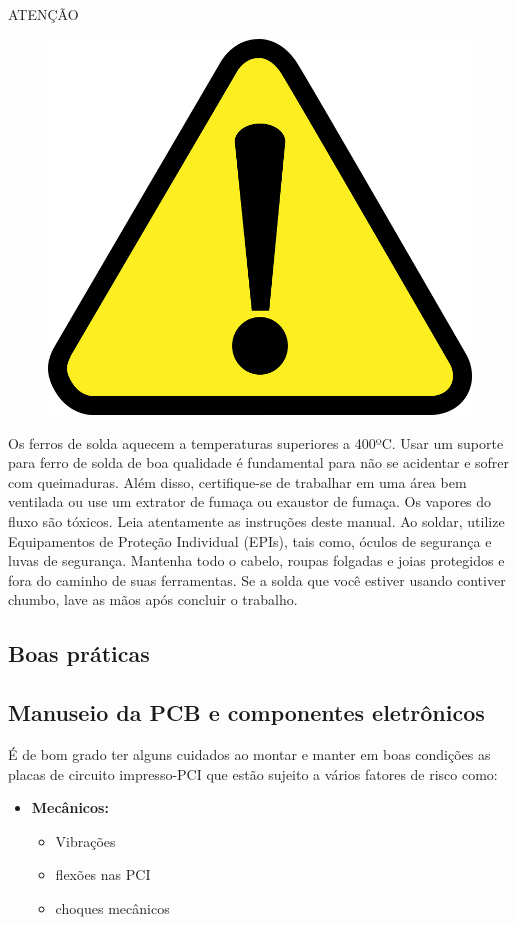 \begin{center}
ATENÇÃO
\begin{figure}[H]
 \centering
 \includegraphics[scale = 0.1]{Figuras/atenção.png}
\end{figure}
\end{center}

\par Os ferros de solda aquecem a temperaturas superiores a 400ºC. Usar um suporte para ferro de solda de boa qualidade é fundamental para não se acidentar e sofrer com queimaduras. Além disso, certifique-se de trabalhar em uma área bem ventilada ou use um extrator de fumaça ou exaustor de fumaça. Os vapores do fluxo são tóxicos. Leia atentamente as instruções deste manual. Ao soldar, utilize Equipamentos de Proteção Individual (EPIs), tais como, óculos de segurança e luvas de segurança. Mantenha todo o cabelo, roupas folgadas e joias protegidos e fora do caminho de suas ferramentas. Se a solda que você estiver usando contiver chumbo, lave as mãos após concluir o trabalho.


\subsection{Boas práticas}

\subsection{Manuseio da PCB e componentes eletrônicos}
\PAR É de bom grado ter alguns cuidados ao montar e manter em boas condições as placas de circuito impresso-PCI que estão sujeito a vários fatores de risco como:
\begin{itemize}
\item \textbf{Mecânicos:}
\begin{itemize}
\item Vibrações
\item flexões nas PCI 
\item choques mecânicos
\end{itemize}
\end{itemize}

